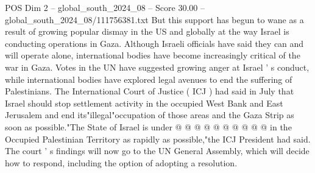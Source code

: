 \begin{textsample}{POS Dim 2 – global\_south\_2024\_08 – Score 30.00 – global\_south\_2024\_08/111756381.txt}
But this support has begun to wane as a result of growing popular dismay in the US and globally at the way Israel is conducting operations in Gaza.
Although Israeli officials have said they can and will operate alone, international bodies have become increasingly critical of the war in Gaza.
Votes in the UN have suggested growing anger at Israel ' s conduct, while international bodies have explored legal avenues to end the suffering of Palestinians.
The International Court of Justice ( ICJ ) had said in July that Israel should stop settlement activity in the occupied West Bank and East Jerusalem and end its"illegal"occupation of those areas and the Gaza Strip as soon as possible."The State of Israel is under @ @ @ @ @ @ @ @ @ @ in the Occupied Palestinian Territory as rapidly as possible,"the ICJ President had said.
The court ' s findings will now go to the UN General Assembly, which will decide how to respond, including the option of adopting a resolution.

\end{textsample}
